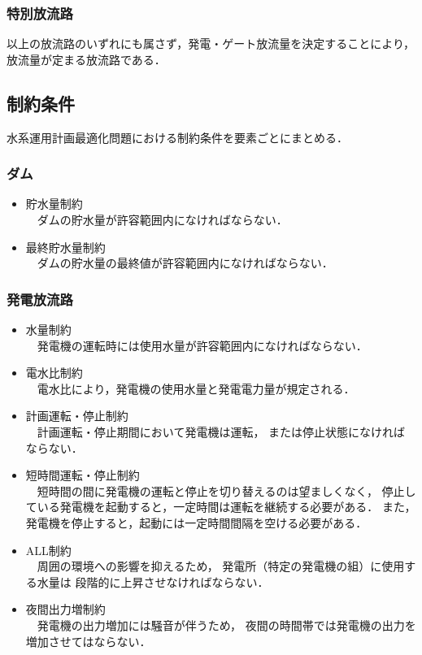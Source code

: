 	\subsubsection*{特別放流路}
		以上の放流路のいずれにも属さず，発電・ゲート放流量を決定することにより，
		放流量が定まる放流路である．
\subsection{制約条件}
	水系運用計画最適化問題における制約条件を要素ごとにまとめる．
	\subsubsection*{ダム} 
		\begin{itemize}
			\item 貯水量制約 \\
			　ダムの貯水量が許容範囲内になければならない．
			\item 最終貯水量制約 \\
			　ダムの貯水量の最終値が許容範囲内になければならない．
		\end{itemize}	
	\subsubsection*{発電放流路}
		\begin{itemize}
			\item 水量制約 \\
			　発電機の運転時には使用水量が許容範囲内になければならない．
			\item 電水比制約 \\
			　電水比により，発電機の使用水量と発電電力量が規定される．
			\item 計画運転・停止制約 \\
			　計画運転・停止期間において発電機は運転，%
			または停止状態になければならない．
			\item 短時間運転・停止制約 \\
			　短時間の間に発電機の運転と停止を切り替えるのは望ましくなく，
			停止している発電機を起動すると，一定時間は運転を継続する必要がある．
			また，発電機を停止すると，起動には一定時間間隔を空ける必要がある．
			\item ALL制約 \\
			　周囲の環境への影響を抑えるため，%
			発電所（特定の発電機の組）に使用する水量は%
			段階的に上昇させなければならない．
			\item 夜間出力増制約 \\
			　発電機の出力増加には騒音が伴うため，%
			夜間の時間帯では発電機の出力を増加させてはならない．
		\end{itemize}
